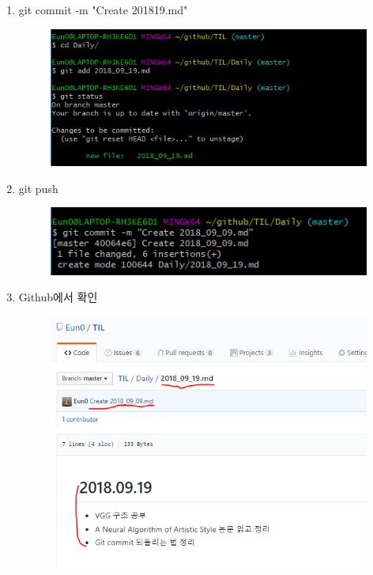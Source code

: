\documentclass[a4paper]{article}
\begin{document}
\begin{enumerate}
\begin{figure}[htbp]
\begin{center}
			\end{center}
		\end{figure}
		\newpage
		\item git commit -m "Create 2018\textunderscore19.md"
		\begin{figure}[htbp]
			\begin{center}
				\includegraphics[scale=0.8]{source/4}
			\end{center}
		\end{figure}
		\item git push
		\begin{figure}[htbp]
			\begin{center}
				\includegraphics[scale=0.8]{source/5}
			\end{center}
		\end{figure}
		\item Github에서 확인
		\begin{figure}[htbp]
			\begin{center}
				\includegraphics[scale=0.8]{source/3}
			\end{center}
		\end{figure}
		
	\end{enumerate}
	
	
	
	
	
	
	
	
	
	
	
	
	
	
\end{document}

